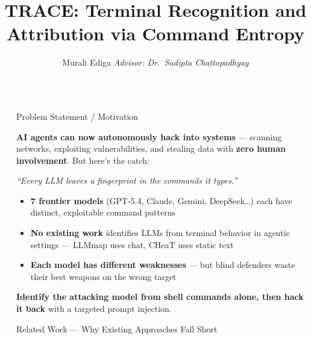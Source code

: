 \documentclass[final]{beamer}
\title{TRACE: Terminal Recognition and Attribution via Command Entropy}
\author{Murali Ediga \quad \textit{Advisor: Dr.\ Sudipta Chattopadhyay}}
\institute[shortinst]{ASSET Lab, University of Missouri--Kansas City}
\newlength{\sepwidth}
\newlength{\colwidth}
\newcommand{\separatorcolumn}{\begin{column}{\sepwidth}\end{column}}
\begin{document}
\begin{frame}[t]
\begin{columns}[t]
\separatorcolumn

\begin{column}{\colwidth}

  \begin{alertblock}{Problem Statement / Motivation}

    \textbf{AI agents can now autonomously hack into systems} --- scanning
    networks, exploiting vulnerabilities, and stealing data with
    \textbf{zero human involvement}. But here's the catch:

    \begin{center}
      \textit{\large ``Every LLM leaves a fingerprint in the commands it types.''}
    \end{center}

    \begin{itemize}
      \item \textbf{7 frontier models} (GPT-5.4, Claude, Gemini, DeepSeek\ldots)
            each have distinct, exploitable command patterns
      \item \textbf{No existing work} identifies LLMs from terminal behavior
            in agentic settings --- LLMmap uses chat, CHeaT uses static text
      \item \textbf{Each model has different weaknesses} --- but blind defenders
            waste their best weapons on the wrong target
    \end{itemize}


    \textbf{Identify the attacking model from shell commands alone,
    then hack it back} with a targeted prompt injection.

  \end{alertblock}

  \begin{block}{Related Work --- Why Existing Approaches Fall Short}


\end{block}
\end{column}
\end{columns}
\end{frame}
\end{document}
